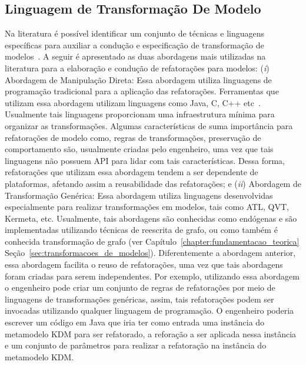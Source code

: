 \subsection{Linguagem de Transformação De Modelo}

Na literatura é possível identificar um conjunto de técnicas e linguagens específicas para auxiliar a condução e especificação de transformação de modelos~\cite{Biehl_2010, Mens_2006, Allilaire_06}. A seguir é apresentado as duas abordagens mais utilizadas na literatura para a elaboração e condução de refatorações para modelos: (\textit{i}) Abordagem de Manipulação Direta: Essa abordagem utiliza linguagens de programação tradicional para a aplicação das refatorações. Ferramentas que utilizam essa abordagem utilizam linguagens como Java, C, C++ etc~\cite{Bruneliere_2014}. Usualmente tais linguagens proporcionam uma infraestrutura mínima para organizar as transformações. Algumas características de suma importância para refatorações de modelo como, regras de transformações, preservação de comportamento são, usualmente criadas pelo engenheiro, uma vez que tais linguagens não possuem API para lidar com tais características. Dessa forma, refatorações que utilizam essa abordagem tendem a ser dependente de plataformas, afetando assim a reusabilidade das refatorações; e (\textit{ii}) Abordagem de Transformação Genérica: Essa abordagem utiliza linguagens desenvolvidas especialmente para realizar transformações em modelos, tais como ATL, QVT, Kermeta, etc. Usualmente, tais abordagens são conhecidas como endógenas e são implementadas utilizando técnicas de reescrita de grafo, ou como também é conhecida transformação de grafo (ver Capítulo~\ref{chapter:fundamentacao_teorica} Seção~\ref{sec:transformacoes_de_modelos}). Diferentemente a abordagem anterior, essa abordagem facilita o reuso de refatorações, uma vez que tais abordagens foram criadas para serem independentes. Por exemplo, utilizando essa abordagem o engenheiro pode criar um conjunto de regras de refatorações por meio de linguagens de transformações genéricas, assim, tais refatorações podem ser invocadas utilizando qualquer linguagem de programação. O engenheiro poderia escrever um código em Java que iria ter como entrada uma instância do metamodelo KDM para ser refatorado, a reforação a ser aplicada nessa instância e um conjunto de parâmetros para realizar a refatoração na instância do metamodelo KDM.

